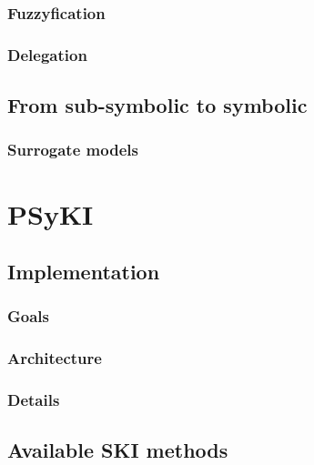 \documentclass[12pt,a4paper,openright,twoside]{book}
\begin{document}
\subsection{Fuzzyfication}\label{subsec:fuzzyfication}

\subsection{Delegation}\label{subsec:delegation}

\section{From sub-symbolic to symbolic}\label{sec:from-sub-symbolic-to-symbolic}

\subsection{Surrogate models}\label{subsec:surrogate-models}


\chapter{\Acl{PSyKI}}\label{ch:psyki}

\section{Implementation}\label{sec:implementation}

\subsection{Goals}\label{subsec:goals}

\subsection{Architecture}\label{subsec:architecture}

\subsection{Details}\label{subsec:details}

\section{Available \ac{SKI} methods}\label{sec:available-ski-methods}
\end{document}
